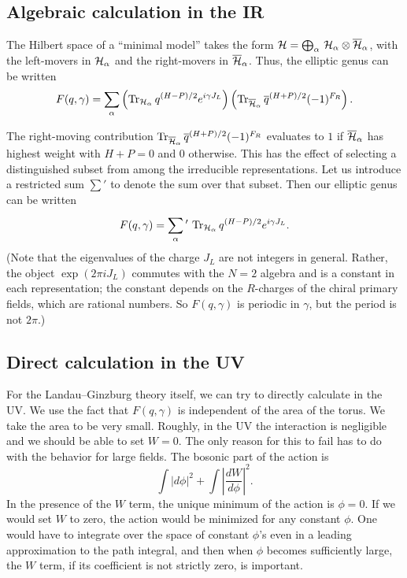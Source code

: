 \subsection{Algebraic calculation in the IR}

The Hilbert space of a ``minimal model'' takes the form
${\cal H}=\bigoplus_\alpha\,{\cal H}_\alpha \otimes \overline{\cal H}_\alpha$,
with the left-movers in ${\cal H}_\alpha$ and the right-movers in
$\overline{\cal H}_\alpha$.
Thus, the elliptic genus can be written
$$F(q,\gamma)=\sum_\alpha\left(\mathop{\rm Tr}\nolimits_{{\cal H}_\alpha} q^{(H-P)/2}e^{i\gamma
J_L}\right)
\left(\mathop{\rm Tr}\nolimits_{\overline{\cal H}_\alpha}\overline{q}^{(H+P)/2}(-1)^{F_R}\right).$$

The right-moving contribution $\mathop{\rm Tr}\nolimits_{\overline{\cal
H}_\alpha}\overline{q}^{(H+P)/2}(-1)^{F_R}$
evaluates to $1$ if
$\overline{\cal H}_\alpha$ has highest weight with $H+P=0$ and $0$ otherwise.
This has the
effect of selecting a distinguished subset from among the irreducible
representations.  Let us introduce a restricted sum
$\sum'$ to denote the sum over that subset.  Then our elliptic genus can be
written
$$F(q,\gamma)=\sum^{\,}_\alpha\vphantom{\sum}'\, \mathop{\rm Tr}\nolimits_{{\cal
H}_\alpha}q^{(H-P)/2}e^{i\gamma J_L}.$$
(Note that the eigenvalues of the charge $J_L$ are not integers in general.
Rather, the object
$\exp(2\pi i J_L)$ commutes with the $N=2$ algebra and is a constant in each
representation;
the constant depends on the $R$-charges of the chiral primary fields, which
are rational numbers.
So $F(q,\gamma)$ is periodic in $\gamma$, but the period is not $2\pi$.)

\subsection{Direct calculation in the UV}

For the Landau--Ginzburg theory itself, we can try to directly calculate in
the UV.
We use the fact that $F(q,\gamma)$ is independent of the area of the torus.
We take
the area to be very small.  Roughly, in the UV
the interaction is negligible and we should be able to set $W=0$.
The only reason for this to fail has to do with the behavior for large fields.
The bosonic part of the action is
$$\int|d\phi|^2+\int\left|\frac{dW}{d\phi}\right|^2.$$
In the presence of the $W$ term, the unique minimum of the action is $\phi=0$.
If we would set $W$ to zero, the action would be minimized for any constant
$\phi$.
One would have to integrate over the space of constant $\phi$'s even in a
leading approximation
to the path integral, and then when $\phi$ becomes sufficiently large, the $W$
term, if
its coefficient is not strictly zero, is important.

